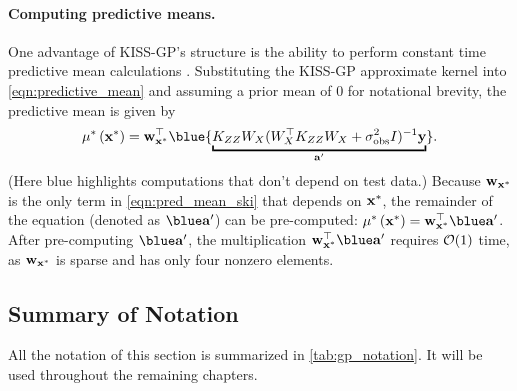 \paragraph{Computing predictive means.}
One advantage of KISS-GP's structure is the ability to perform constant time predictive mean calculations \cite{wilson2015thoughts}.
Substituting the KISS-GP approximate kernel into \cref{eqn:predictive_mean} and assuming a prior mean of 0 for notational brevity, the predictive mean is given by
\begin{equation}
  \meantest{\bxtest} = \bw_{\bxtest}^\top {\blue{\underbracket{\bK_{\bZ\bZ} \bW_{\bX}(\bW_{\bX}^{\top}\bK_{\bZ\bZ}\bW_{\bX} + \sigma_\text{obs}^{2} \bI)^{-1} \by}_{\ba'}}}.
  \label{eqn:pred_mean_ski}
\end{equation}
(Here {\color{blue} blue} highlights computations that don't depend on test data.)
Because $\mathbf{w}_{\mathbf{x}^{*}}$ is the only term in \cref{eqn:pred_mean_ski} that depends on $\mathbf{x}^{*}$, the remainder of the equation (denoted as $\blue \ba'$) can be pre-computed: $\meantest{\bxtest} = \bw_{\bxtest}^\top \blue \ba'$.
After pre-computing $\blue \ba'$, the multiplication $\bw_{\bxtest}^\top \blue \ba'$ requires $\bigo{1}$ time, as $\mathbf{w}_{\mathbf{x}^*}$ is sparse and has only four nonzero elements.

\subsection{Summary of Notation}
All the notation of this section is summarized in \cref{tab:gp_notation}.
It will be used throughout the remaining chapters.

